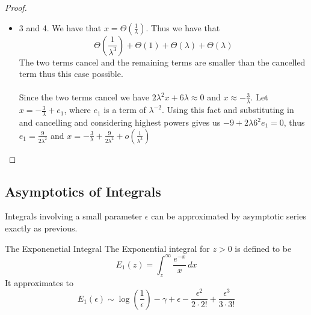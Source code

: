 \documentclass[a4paper]{article}
\begin{document}
\begin{eg}{}{}
\begin{proof}
\begin{itemize}
\item 3 and 4. We have that $x=\Theta\left(\frac{1}{\lambda}\right)$. Thus we have that $$\Theta\left(\frac{1}{\lambda^3}\right)+\Theta(1)+\Theta(\lambda)+\Theta(\lambda)$$ The two terms cancel and the remaining terms are smaller than the cancelled term thus this case possible. \\~\\
Since the two terms cancel we have $2\lambda^2x+6\lambda\approx0$ and $x\approx-\frac{3}{\lambda}$. Let $x=-\frac{3}{\lambda}+e_1$, where $e_1$ is a term of $\lambda^{-2}$. Using this fact and substituting in and cancelling and considering highest powers gives us $-9+2\lambda6^2e_1=0$, thus $e_1=\frac{9}{2\lambda^2}$ and $x=-\frac{3}{\lambda}+\frac{9}{2\lambda^2}+o\left(\frac{1}{\lambda^3}\right)$
\end{itemize}
\end{proof}
\end{eg}

\subsection{Asymptotics of Integrals}
Integrals involving a small parameter $\epsilon$ can be approximated by asymptotic series exactly as previous. 

\begin{prp}{The Exponenetial Integral}{} The Exponential integral for $z>0$ is defined to be $$E_1(z)=\int_z^\infty\frac{e^{-x}}{x}\,dx$$ It approximates to $$E_1(\epsilon)\sim\log\left(\frac{1}{\epsilon}\right)-\gamma+\epsilon-\frac{\epsilon^2}{2\cdot2!}+\frac{\epsilon^3}{3\cdot3!}$$
\end{prp}
\end{document}
